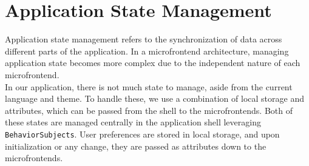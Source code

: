 \section{Application State Management}
Application state management refers to the synchronization of data across different parts of the application. In a microfrontend architecture, managing application state becomes more complex due to the independent nature of each microfrontend. \\

\noindent
In our application, there is not much state to manage, aside from the current language and theme. To handle these, we use a combination of local storage and attributes, which can be passed from the shell to the microfrontends. Both of these states are managed centrally in the application shell leveraging \texttt{BehaviorSubjects}. User preferences are stored in local storage, and upon initialization or any change, they are passed as attributes down to the microfrontends.